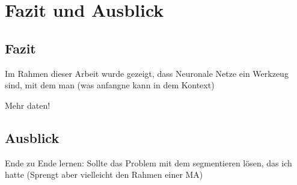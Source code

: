 \chapter{Fazit und Ausblick}


\section{Fazit}

Im Rahmen dieser Arbeit wurde gezeigt, dass Neuronale Netze ein Werkzeug sind, mit dem man (was anfangne kann in dem Kontext)


Mehr daten!

\section{Ausblick}


Ende zu Ende lernen: Sollte das Problem mit dem segmentieren lösen, das ich hatte
(Sprengt aber vielleicht den Rahmen einer MA)
